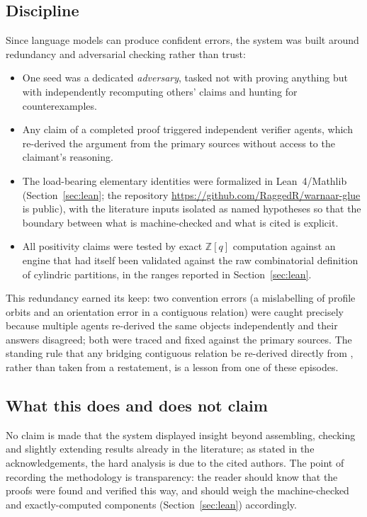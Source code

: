 \documentclass[11pt]{article}
\newcommand{\ZZ}{\mathbb{Z}}
\begin{document}
\subsection*{Discipline}
Since language models can produce confident errors, the system was built
around redundancy and adversarial checking rather than trust:
\begin{itemize}
\item One seed was a dedicated \emph{adversary}, tasked not with proving
anything but with independently recomputing others' claims and hunting
for counterexamples.
\item Any claim of a completed proof triggered independent verifier
agents, which re-derived the argument from the primary sources without
access to the claimant's reasoning.
\item The load-bearing elementary identities were formalized in
Lean~4/Mathlib (Section~\ref{sec:lean}; the repository
\url{https://github.com/RaggedR/warnaar-glue} is public), with the
literature inputs isolated as named hypotheses so that the boundary
between what is machine-checked and what is cited is explicit.
\item All positivity claims were tested by exact $\ZZ[q]$ computation
against an engine that had itself been validated against the raw
combinatorial definition of cylindric partitions, in the ranges reported
in Section~\ref{sec:lean}.
\end{itemize}
This redundancy earned its keep: two convention errors (a mislabelling of
profile orbits and an orientation error in a contiguous relation) were
caught precisely because multiple agents re-derived the same objects
independently and their answers disagreed; both were traced and fixed
against the primary sources. The standing rule that any bridging
contiguous relation be re-derived directly from \cite[Lemma~9.2]{KR22},
rather than taken from a restatement, is a lesson from one of these
episodes.

\subsection*{What this does and does not claim}
No claim is made that the system displayed insight beyond assembling,
checking and slightly extending results already in the literature; as
stated in the acknowledgements, the hard analysis is due to the cited
authors. The point of recording the methodology is transparency: the
reader should know that the proofs were found and verified this way, and
should weigh the machine-checked and exactly-computed components
(Section~\ref{sec:lean}) accordingly.
\end{document}
